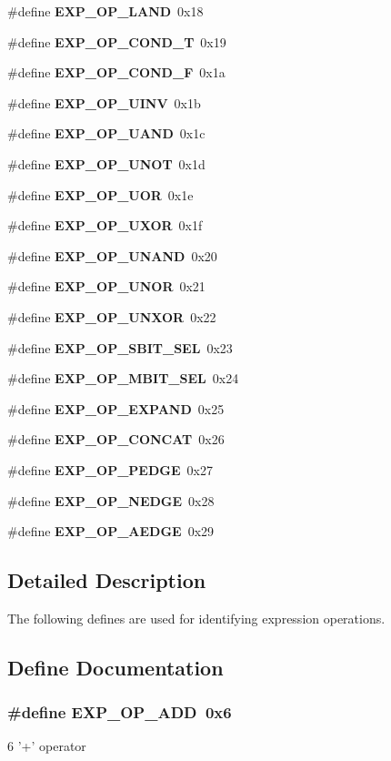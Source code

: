 \begin{CompactItemize}
\#define {\bf EXP\_\-OP\_\-LAND}\ 0x18
\item 
\#define {\bf EXP\_\-OP\_\-COND\_\-T}\ 0x19
\item 
\#define {\bf EXP\_\-OP\_\-COND\_\-F}\ 0x1a
\item 
\#define {\bf EXP\_\-OP\_\-UINV}\ 0x1b
\item 
\#define {\bf EXP\_\-OP\_\-UAND}\ 0x1c
\item 
\#define {\bf EXP\_\-OP\_\-UNOT}\ 0x1d
\item 
\#define {\bf EXP\_\-OP\_\-UOR}\ 0x1e
\item 
\#define {\bf EXP\_\-OP\_\-UXOR}\ 0x1f
\item 
\#define {\bf EXP\_\-OP\_\-UNAND}\ 0x20
\item 
\#define {\bf EXP\_\-OP\_\-UNOR}\ 0x21
\item 
\#define {\bf EXP\_\-OP\_\-UNXOR}\ 0x22
\item 
\#define {\bf EXP\_\-OP\_\-SBIT\_\-SEL}\ 0x23
\item 
\#define {\bf EXP\_\-OP\_\-MBIT\_\-SEL}\ 0x24
\item 
\#define {\bf EXP\_\-OP\_\-EXPAND}\ 0x25
\item 
\#define {\bf EXP\_\-OP\_\-CONCAT}\ 0x26
\item 
\#define {\bf EXP\_\-OP\_\-PEDGE}\ 0x27
\item 
\#define {\bf EXP\_\-OP\_\-NEDGE}\ 0x28
\item 
\#define {\bf EXP\_\-OP\_\-AEDGE}\ 0x29
\end{CompactItemize}


\subsection{Detailed Description}
The following defines are used for identifying expression operations. 

\subsection{Define Documentation}
\subsubsection{\setlength{\rightskip}{0pt plus 5cm}\#define EXP\_\-OP\_\-ADD\ 0x6}\label{group__expr__ops_a6}


6 '+' operator 

